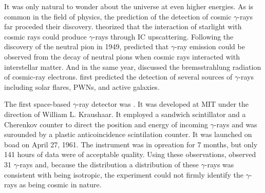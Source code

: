 It was only natural to wonder about the universe at even higher energies.
As is common in the field of physics, the prediction of
the detection of cosmic $\gamma$-rays far proceded their discovery.
\cite{cosmic_rays_feenberg_1948} theorized that the interaction
of starlight with cosmic rays could produce $\gamma$-rays through
\ac{IC} upscattering.  Following the discovery of the neutral
pion in 1949, \cite{propagation_cosmic_radiation_hayakawa_1952}
predicted that $\gamma$-ray emission could be observed from the
decay of neutral pions when cosmic rays interacted with interstellar
matter.  And in the same year, \cite{cosmic_ray_hutchinson_1952}
discussed the bremsstrahlung radiation of cosmic-ray electrons.
\cite{gamma_ray_astronomy_morrison_1958} first predicted the detection
of several sources of $\gamma$-rays including solar flares, \acp{PWN},
and active galaxies.

    



The first space-based $\gamma$-ray detector was \explorerxi
\cite{explorer_xi_kraushaar_1965}.  It was developed at \ac{MIT}
under the direction of William L. Kraushaar.  It employed a sandwich
scintillator and a Cherenkov counter to direct the position and energy
of incoming $\gamma$-rays and was surounded by a plastic anticoincidence
scintilation counter.  It was launched on boad \explorerxi on April 27,
1961.  The instrument was in opreation for 7 months, but only 141 hours
of data were of acceptable quality.  Using these observations, \explorerxi
observed 31 $\gamma$-rays and, because the distribution a distribution of
these $\gamma$-rays was consistent with being isotropic, the experiment
could not firmly identify the $\gamma$-rays as being cosmic in nature.


